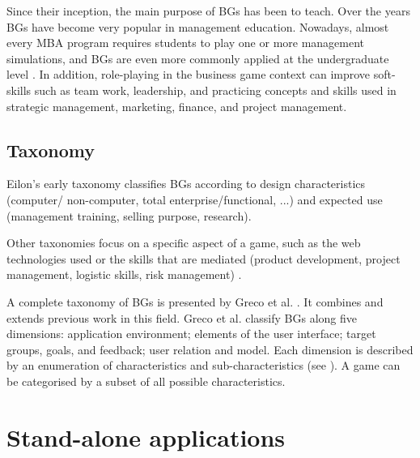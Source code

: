 Since their inception, the main purpose of BGs has been to teach. 
Over the years BGs have become very popular in management education. 
Nowadays, almost every MBA program requires students to play one or more management simulations, and BGs are even more commonly applied at the undergraduate level \cite{faria}. 
In addition, role-playing in the business game context can improve soft-skills such as team work, leadership, and practicing concepts and skills used in strategic management, marketing, finance, and project management.

\subsection{Taxonomy}
\label{subsec:tax}

Eilon's early taxonomy \cite{eilon} classifies BGs according to design characteristics (computer/ non-computer, total enterprise/functional, ...) and expected use (management training, selling purpose, research). 

Other taxonomies focus on a specific aspect of a game, such as the web technologies used \cite{web} or the skills that are mediated (product development, project management, logistic skills, risk management) \cite{skill}.

A complete taxonomy of BGs is presented by Greco et al. \cite{greco}. It combines and extends previous work \cite{tax1,tax2,tax3} in this field. 
Greco et al. classify BGs along five dimensions: application environment; elements of the user interface; target groups, goals, and feedback; user relation and model.
Each dimension is described by an enumeration of characteristics and sub-characteristics (see \cite{greco}).
A game can be categorised by a subset of all possible characteristics. 



\section{Stand-alone applications}
\label{sec:standalone}

